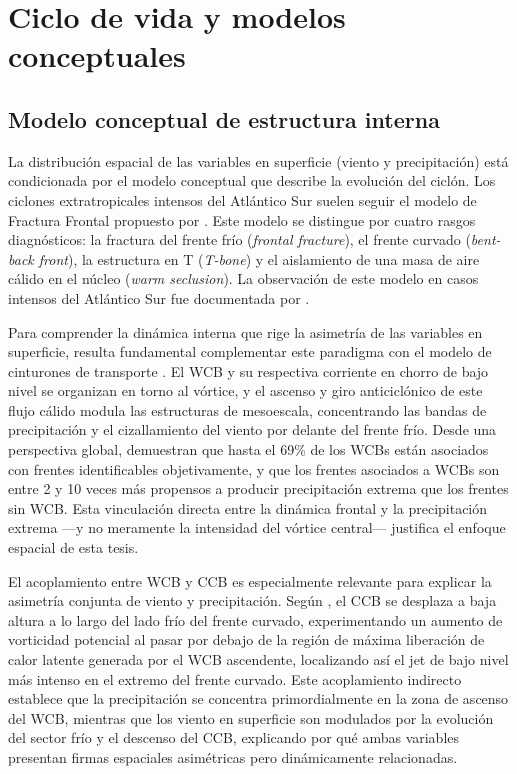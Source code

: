 \section{Ciclo de vida y modelos conceptuales}\label{sec:tb_evolucion}

\subsection{Modelo conceptual de estructura interna}\label{subsec:tb_modelos}

La distribución espacial de las variables en superficie (viento y precipitación) está condicionada por el modelo conceptual que describe la evolución del ciclón. Los ciclones extratropicales intensos del Atlántico Sur suelen seguir el modelo de Fractura Frontal propuesto por \citet{shapiro1990life}. Este modelo se distingue por cuatro rasgos diagnósticos: la fractura del frente frío (\textit{frontal fracture}), el frente curvado (\textit{bent-back front}), la estructura en T (\textit{T-bone}) y el aislamiento de una masa de aire cálido en el núcleo (\textit{warm seclusion}). La observación de este modelo en casos intensos del Atlántico Sur fue documentada por \citet{shapiro1999bridge}.

Para comprender la dinámica interna que rige la asimetría de las variables en superficie, resulta fundamental complementar este paradigma con el modelo de cinturones de transporte \citep{browning1986conceptual}. El WCB y su respectiva corriente en chorro de bajo nivel se organizan en torno al vórtice, y el ascenso y giro anticiclónico de este flujo cálido modula las estructuras de mesoescala, concentrando las bandas de precipitación y el cizallamiento del viento por delante del frente frío. Desde una perspectiva global, \citet{catto2015fronts} demuestran que hasta el 69\% de los WCBs están asociados con frentes identificables objetivamente, y que los frentes asociados a WCBs son entre 2 y 10 veces más propensos a producir precipitación extrema que los frentes sin WCB. Esta vinculación directa entre la dinámica frontal y la precipitación extrema —y no meramente la intensidad del vórtice central— justifica el enfoque espacial de esta tesis.

El acoplamiento entre WCB y CCB es especialmente relevante para explicar la asimetría conjunta de viento y precipitación. Según \citet{schemm2014ccb}, el CCB se desplaza a baja altura a lo largo del lado frío del frente curvado, experimentando un aumento de vorticidad potencial al pasar por debajo de la región de máxima liberación de calor latente generada por el WCB ascendente, localizando así el jet de bajo nivel más intenso en el extremo del frente curvado. Este acoplamiento indirecto establece que la precipitación se concentra primordialmente en la zona de ascenso del WCB, mientras que los viento en superficie son modulados por la evolución del sector frío y el descenso del CCB, explicando por qué ambas variables presentan firmas espaciales asimétricas pero dinámicamente relacionadas.

